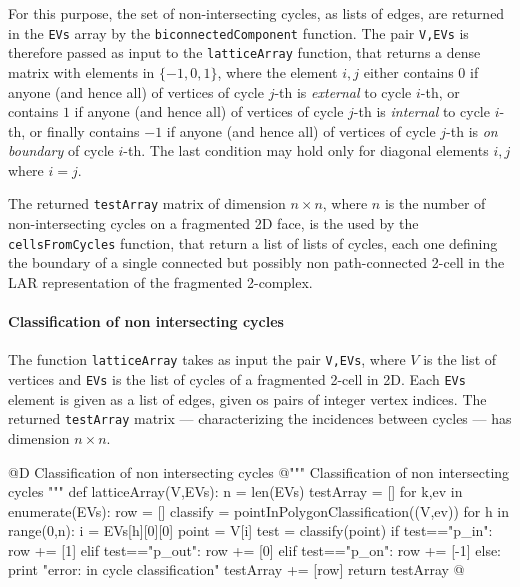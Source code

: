 \documentclass[11pt,oneside]{article}	%
\begin{document}
For this purpose, the set of non-intersecting cycles, as lists of edges, are returned in the \texttt{EVs} array by the \texttt{biconnectedComponent} function. The pair \texttt{V,EVs} is therefore passed as input to the \texttt{latticeArray} function, that returns a dense matrix with elements in $\{-1,0,1\}$, where the element $i,j$ either contains $0$ if anyone (and hence all) of vertices of cycle $j$-th is \emph{external} to cycle $i$-th, or contains $1$ if anyone (and hence all) of vertices of cycle $j$-th is \emph{internal} to cycle $i$-th, or finally contains $-1$ if anyone (and hence all) of vertices of cycle $j$-th is \emph{on boundary} of cycle $i$-th. The last condition may hold only for diagonal elements $i,j$ where $i=j$.

The returned \texttt{testArray} matrix of dimension $n\times n$, where $n$ is the number of non-intersecting cycles on a fragmented 2D face, is the used by the \texttt{cellsFromCycles} function, that return a list of lists of cycles, each one defining the boundary of a single connected but possibly non path-connected 2-cell in the LAR representation of the fragmented 2-complex. 

\paragraph{Classification of non intersecting cycles}

The function \texttt{latticeArray} takes as input the pair \texttt{V,EVs}, where $V$ is the list of vertices and \texttt{EVs} is the list of cycles of a fragmented 2-cell in 2D. Each \texttt{EVs} element is given as a list of edges, given os pairs of integer vertex indices.
The returned \texttt{testArray} matrix --- characterizing the incidences between cycles --- has dimension $n\times n$.

@D Classification of non intersecting cycles
@{""" Classification of non intersecting cycles """
def latticeArray(V,EVs):
    n = len(EVs)
    testArray = []
    for k,ev in enumerate(EVs):
        row = []
        classify = pointInPolygonClassification((V,ev))
        for h in range(0,n):
            i = EVs[h][0][0]
            point = V[i]
            test = classify(point)
            if test=="p_in": row += [1]
            elif test=="p_out": row += [0]
            elif test=="p_on": row += [-1]
            else: print "error: in cycle classification"
        testArray += [row]
    return testArray
@}
\end{document}
